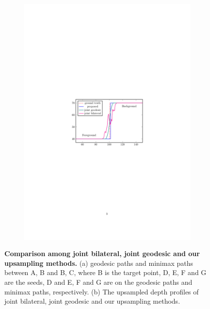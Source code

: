 \documentclass[preprint,10pt,5p,times,twocolumn]{elsarticle}
\begin{document}
\begin{figure}[t]
\begin{subfigure}[b]{0.4\linewidth}
    \includegraphics[width=\linewidth]{JUE.pdf}
    \caption{}
    \label{fig:path:edge}
\end{subfigure}
\caption{\textbf{Comparison among joint bilateral, joint geodesic and our upsampling methods.} (a) geodesic paths and minimax paths between A, B and B, C, where B is the target point, D, E, F and G are the seeds, D and E, F and G are  on the geodesic paths and minimax paths, respectively. (b) The upsampled depth profiles of joint bilateral, joint geodesic and our upsampling methods.}
\label{fig:path}
\end{figure}
\end{document}

